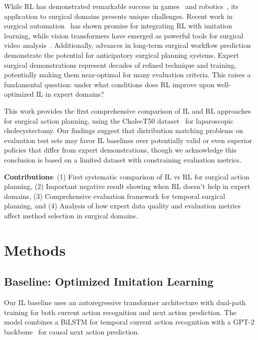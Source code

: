 \documentclass[runningheads]{llncs}
\begin{document}
While RL has demonstrated remarkable success in games~\cite{mnih2015human} and robotics~\cite{levine2016end}, its application to surgical domains presents unique challenges. Recent work in surgical automation~\cite{liu2024surgical} has shown promise for integrating RL with imitation learning, while vision transformers have emerged as powerful tools for surgical video analysis~\cite{wagner2023vision,liu2023skit,liu2025lovit}. Additionally, advances in long-term surgical workflow prediction~\cite{boels2025swag} demonstrate the potential for anticipatory surgical planning systems. Expert surgical demonstrations represent decades of refined technique and training, potentially making them near-optimal for many evaluation criteria. This raises a fundamental question: under what conditions does RL improve upon well-optimized IL in expert domains?

This work provides the first comprehensive comparison of IL and RL approaches for surgical action planning, using the CholecT50 dataset~\cite{nwoye2022cholect50} for laparoscopic cholecystectomy. Our findings suggest that distribution matching problems on evaluation test sets may favor IL baselines over potentially valid or even superior policies that differ from expert demonstrations, though we acknowledge this conclusion is based on a limited dataset with constraining evaluation metrics.

\textbf{Contributions}: (1) First systematic comparison of IL vs RL for surgical action planning, (2) Important negative result showing when RL doesn't help in expert domains, (3) Comprehensive evaluation framework for temporal surgical planning, and (4) Analysis of how expert data quality and evaluation metrics affect method selection in surgical domains.

\section{Methods}

\subsection{Baseline: Optimized Imitation Learning}

Our IL baseline uses an autoregressive transformer architecture with dual-path training for both current action recognition and next action prediction. The model combines a BiLSTM for temporal current action recognition with a GPT-2 backbone~\cite{radford2019language} for causal next action prediction.
\end{document}
